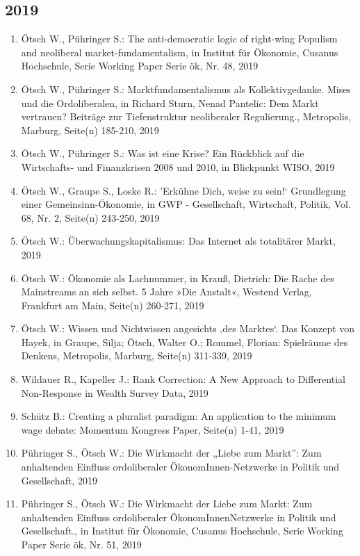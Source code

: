 \subsection*{2019}
\begin{enumerate}
    	 \item Ötsch W., Pühringer S.: The anti-democratic logic of right-wing Populism and neoliberal market-fundamentalism, in Institut für Ökonomie, Cusanus Hochschule, Serie Working Paper Serie ök, Nr. 48, 2019
	 \item Ötsch W., Pühringer S.: Marktfundamentalismus als Kollektivgedanke. Mises und die Ordoliberalen, in Richard Sturn, Nenad Pantelic: Dem Markt vertrauen? Beiträge zur Tiefenstruktur neoliberaler Regulierung., Metropolis, Marburg, Seite(n) 185-210, 2019
	 \item Ötsch W., Pühringer S.: Was ist eine Krise? Ein Rückblick auf die Wirtschafts- und Finanzkrisen 2008 und 2010, in Blickpunkt WISO, 2019
	 \item Ötsch W., Graupe S., Loske R.: ’Erkühne Dich, weise zu sein!‘ Grundlegung einer Gemeinsinn-Ökonomie, in GWP - Gesellschaft, Wirtschaft, Politik, Vol. 68, Nr. 2, Seite(n) 243-250, 2019
	 \item Ötsch W.: Überwachungskapitalismus: Das Internet als totalitärer Markt, 2019
	 \item Ötsch W.: Ökonomie als Lachnummer, in Krauß, Dietrich: Die Rache des Mainstreams an sich selbst. 5 Jahre »Die Anstalt«, Westend Verlag, Frankfurt am Main, Seite(n) 260-271, 2019
	 \item Ötsch W.: Wissen und Nichtwissen angesichts ‚des Marktes‘. Das Konzept von Hayek, in Graupe, Silja; Ötsch, Walter O.; Rommel, Florian: Spielräume des Denkens, Metropolis, Marburg, Seite(n) 311-339, 2019
	 \item Wildauer R., Kapeller J.: Rank Correction: A New Approach to Differential Non-Response in Wealth Survey Data, 2019
	 \item Schütz B.: Creating a pluralist paradigm: An application to the minimum wage debate: Momentum Kongress Paper, Seite(n) 1-41, 2019
	 \item Pühringer S., Ötsch W.: Die Wirkmacht der „Liebe zum Markt”: Zum anhaltenden Einfluss ordoliberaler ÖkonomInnen-Netzwerke in Politik und Gesellschaft, 2019
	 \item Pühringer S., Ötsch W.: Die Wirkmacht der \glqq Liebe zum Markt\grqq{}: Zum anhaltenden Einfluss ordoliberaler ÖkonomInnenNetzwerke in Politik und Gesellschaft., in Institut für Ökonomie, Cusanus Hochschule, Serie Working Paper Serie ök, Nr. 51, 2019

\end{enumerate}
